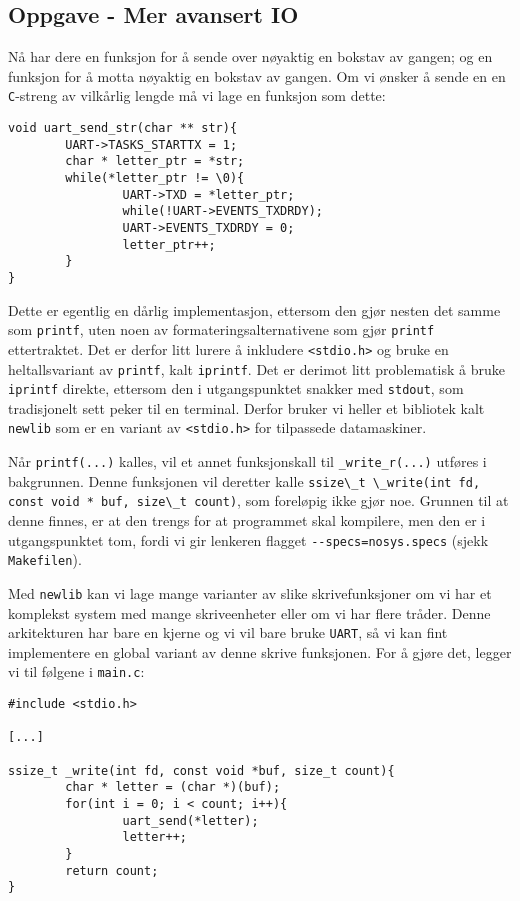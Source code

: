 \subsection{Oppgave - Mer avansert IO}

Nå har dere en funksjon for å sende over nøyaktig en bokstav av gangen; og en funksjon for å motta nøyaktig en bokstav av gangen. Om vi ønsker å sende en en \verb|C|-streng av vilkårlig lengde må vi lage en funksjon som dette:

\begin{lstlisting}
void uart_send_str(char ** str){
        UART->TASKS_STARTTX = 1;
        char * letter_ptr = *str;
        while(*letter_ptr != \0){
                UART->TXD = *letter_ptr;
                while(!UART->EVENTS_TXDRDY);
                UART->EVENTS_TXDRDY = 0;
                letter_ptr++;
        }
}
\end{lstlisting}


Dette er egentlig en dårlig implementasjon, ettersom den gjør nesten det samme som \verb|printf|, uten noen av formateringsalternativene som gjør \verb|printf| ettertraktet. Det er derfor litt lurere å inkludere \verb|<stdio.h>| og bruke en heltallsvariant av \verb|printf|, kalt \verb|iprintf|. Det er derimot litt problematisk å bruke \verb|iprintf| direkte, ettersom den i utgangspunktet snakker med \verb|stdout|, som tradisjonelt sett peker til en terminal. Derfor bruker vi heller et bibliotek kalt \verb|newlib| som er en variant av \verb|<stdio.h>| for tilpassede datamaskiner.

Når \verb|printf(...)| kalles, vil et annet funksjonskall til \verb|_write_r(...)| utføres i bakgrunnen. Denne funksjonen vil deretter kalle \lstinline{ssize\_t \_write(int fd, const void * buf, size\_t count)}, som foreløpig ikke gjør noe. Grunnen til at denne finnes, er at den trengs for at programmet skal kompilere, men den er i utgangspunktet tom, fordi vi gir lenkeren flagget \verb|--specs=nosys.specs| (sjekk \verb|Makefilen|).

Med \verb|newlib| kan vi lage mange varianter av slike skrivefunksjoner om vi har et komplekst system med mange skriveenheter eller om vi har flere tråder. Denne arkitekturen har bare en kjerne og vi vil bare bruke \verb|UART|, så vi kan fint implementere en global variant av denne skrive funksjonen. For å gjøre det, legger vi til følgene i \verb|main.c|:


\begin{lstlisting}
#include <stdio.h>

[...]

ssize_t _write(int fd, const void *buf, size_t count){
        char * letter = (char *)(buf);
        for(int i = 0; i < count; i++){
                uart_send(*letter);
                letter++;
        }
        return count;
}
\end{lstlisting}

